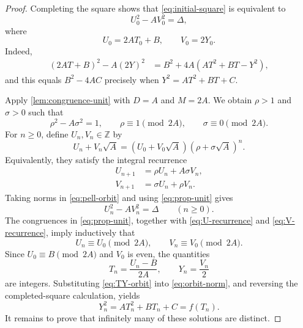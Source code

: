 \documentclass[11pt]{article}
\theoremstyle{remark}
\newcommand{\Z}{\mathbb Z}
\begin{document}
\begin{proof}
Completing the square shows that \eqref{eq:initial-square} is equivalent to
\begin{equation}\label{eq:generalized-pell-initial}
 U_0^2-AV_0^2=\Delta,
\end{equation}
where
\begin{equation}\label{eq:UV-initial}
 U_0=2AT_0+B,
 \qquad
 V_0=2Y_0.
\end{equation}
Indeed,
\begin{align*}
 (2AT+B)^2-A(2Y)^2
 &=B^2+4A(AT^2+BT-Y^2),
\end{align*}
and this equals $B^2-4AC$ precisely when $Y^2=AT^2+BT+C$.

Apply \cref{lem:congruence-unit} with $D=A$ and $M=2A$.  We obtain $\rho>1$ and $\sigma>0$ such that
\begin{equation}\label{eq:prop-unit}
 \rho^2-A\sigma^2=1,
 \qquad
 \rho\equiv1\pmod{2A},
 \qquad
 \sigma\equiv0\pmod{2A}.
\end{equation}
For $n\ge0$, define $U_n,V_n\in\Z$ by
\begin{equation}\label{eq:pell-orbit}
 U_n+V_n\sqrt A=(U_0+V_0\sqrt A)(\rho+\sigma\sqrt A)^n.
\end{equation}
Equivalently, they satisfy the integral recurrence
\begin{align}
 U_{n+1}&=\rho U_n+A\sigma V_n, \label{eq:U-recurrence}\\
 V_{n+1}&=\sigma U_n+\rho V_n. \label{eq:V-recurrence}
\end{align}
Taking norms in \eqref{eq:pell-orbit} and using \eqref{eq:prop-unit} gives
\begin{equation}\label{eq:orbit-norm}
 U_n^2-AV_n^2=\Delta
 \qquad(n\ge0).
\end{equation}
The congruences in \eqref{eq:prop-unit}, together with \eqref{eq:U-recurrence} and \eqref{eq:V-recurrence}, imply inductively that
\begin{equation}\label{eq:orbit-congruences}
 U_n\equiv U_0\pmod{2A},
 \qquad
 V_n\equiv V_0\pmod{2A}.
\end{equation}
Since $U_0\equiv B\pmod{2A}$ and $V_0$ is even, the quantities
\begin{equation}\label{eq:TY-orbit}
 T_n=\frac{U_n-B}{2A},
 \qquad
 Y_n=\frac{V_n}{2}
\end{equation}
are integers.  Substituting \eqref{eq:TY-orbit} into \eqref{eq:orbit-norm}, and reversing the completed-square calculation, yields
\[
 Y_n^2=AT_n^2+BT_n+C=f(T_n).
\]
It remains to prove that infinitely many of these solutions are distinct.


\end{proof}
\end{document}
